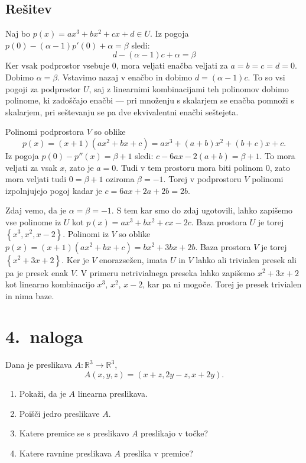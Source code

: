 \documentclass[a4,11pt]{article}
\newcommand{\R}{\mathbb{R}}
\begin{document}
\subsection*{Rešitev}
    Naj bo \(p\left(x\right) = ax^3 + bx^2 + cx + d \in U\).
    Iz pogoja \(p\left(0\right) - \left(\alpha - 1\right)p'\left(0\right) + \alpha = \beta\) sledi:
    \[
        d - \left(\alpha - 1\right)c + \alpha = \beta
    \]
    Ker vsak podprostor vsebuje \(0\), mora veljati enačba veljati za \(a = b = c = d = 0\).
    Dobimo \(\alpha = \beta\). Vstavimo nazaj v enačbo in dobimo \(d = \left(\alpha - 1\right)c\).
    To so vsi pogoji za podprostor \(U\), saj z linearnimi kombinacijami teh polinomov dobimo
    polinome, ki zadoščajo enačbi --- pri množenju s skalarjem se enačba pomnoži s skalarjem, 
    pri seštevanju se pa dve ekvivalentni enačbi seštejeta.

    Polinomi podprostora \(V\) so oblike 
    \[
        p\left(x\right) = \left(x + 1\right)\left(ax^2 + bx + c\right) 
        = ax^3 + \left(a + b\right)x^2 + \left(b + c\right)x + c.
    \]
    Iz pogoja \(p\left(0\right) - p''\left(x\right) = \beta + 1\) sledi:
    \(c - 6 a x - 2\left(a + b\right) = \beta + 1\). To mora veljati za vsak \(x\),
    zato je \(a = 0\). Tudi v tem prostoru mora biti polinom \(0\), zato mora veljati
    tudi \(0 = \beta + 1\) oziroma \(\beta = -1\). Torej v podprostoru \(V\)
    polinomi izpolnjujejo pogoj kadar je \(c = 6ax + 2a + 2b = 2b\).

    Zdaj vemo, da je \(\alpha = \beta = -1\). S tem kar smo do zdaj ugotovili,
    lahko zapišemo vse polinome iz \(U\) kot \(p\left(x\right) = ax^3 + bx^2 + cx - 2c\).
    Baza prostora \(U\) je torej \(\left\{x^3, x^2, x - 2\right\}\).
    Polinomi iz \(V\) so oblike 
    \(p\left(x\right) = \left(x + 1\right)\left(ax^2 + bx + c\right) = bx^2 + 3bx + 2b\).
    Baza prostora \(V\) je torej \(\left\{x^2 + 3x + 2\right\}\). Ker je \(V\) enorazsežen,
    imata \(U\) in \(V\) lahko ali trivialen presek ali pa je presek enak \(V\).
    V primeru netrivialnega preseka lahko zapišemo \(x^2 + 3x + 2\) kot linearno kombinacijo
    \(x^3\), \(x^2\), \(x - 2\), kar pa ni mogoče. Torej je presek trivialen in nima baze.

\section*{4.~naloga}
    Dana je preslikava \(A: \R^3 \to \R^3\),
    \[
        A\left(x, y, z\right) = \left(x + z, 2y - z, x + 2y\right).
    \]
    \begin{enumerate}[label=(\alph*)]
        \item Pokaži, da je \(A\) linearna preslikava.
        \item Poišči jedro preslikave \(A\).
        \item Katere premice se s preslikavo \(A\) preslikajo v točke?
        \item Katere ravnine preslikava \(A\) preslika v premice?
    \end{enumerate}
\end{document}
